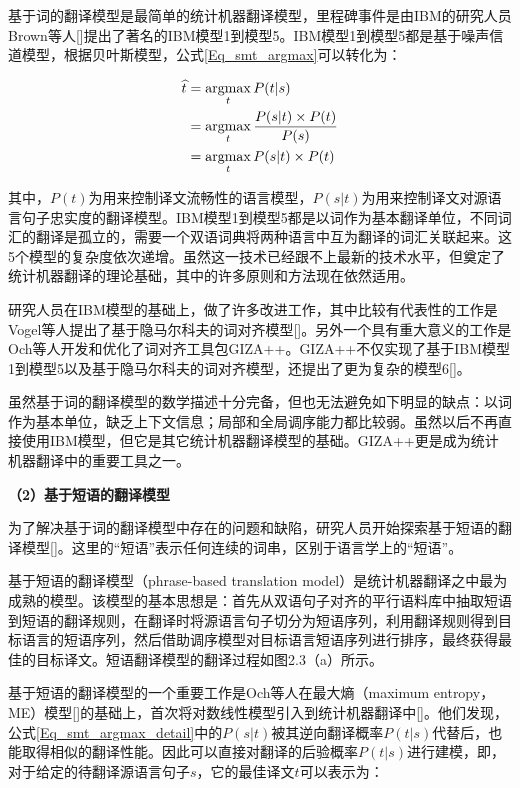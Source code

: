 基于词的翻译模型是最简单的统计机器翻译模型，里程碑事件是由IBM的研究人员Brown等人[\cite{Brown:1990,Brown:1993}]提出了著名的IBM模型1到模型5。IBM模型1到模型5都是基于噪声信道模型，根据贝叶斯模型，公式\ref{Eq_smt_argmax}可以转化为：

\begin{equation}
\label{Eq_smt_argmax_detail}
\begin{split}
\widehat{t} & = \mathop{\argmax}_{t}{P(t|s)} \\
& = \mathop{\argmax}_{t}{\frac{P(s|t) \times P(t)}{P(s)}} \\
& = \mathop{\argmax}_{t}{P(s|t) \times P(t)} 
\end{split}
\end{equation}

其中，$P(t)$为用来控制译文流畅性的语言模型，$P(s|t)$为用来控制译文对源语言句子忠实度的翻译模型。IBM模型1到模型5都是以词作为基本翻译单位，不同词汇的翻译是孤立的，需要一个双语词典将两种语言中互为翻译的词汇关联起来。这5个模型的复杂度依次递增。虽然这一技术已经跟不上最新的技术水平，但奠定了统计机器翻译的理论基础，其中的许多原则和方法现在依然适用。

研究人员在IBM模型的基础上，做了许多改进工作，其中比较有代表性的工作是Vogel等人提出了基于隐马尔科夫的词对齐模型[\cite{Vogel:1996}]。另外一个具有重大意义的工作是Och等人开发和优化了词对齐工具包GIZA++。GIZA++不仅实现了基于IBM模型1到模型5以及基于隐马尔科夫的词对齐模型，还提出了更为复杂的模型6[\cite{Och:2003b}]。

虽然基于词的翻译模型的数学描述十分完备，但也无法避免如下明显的缺点：以词作为基本单位，缺乏上下文信息；局部和全局调序能力都比较弱。虽然以后不再直接使用IBM模型，但它是其它统计机器翻译模型的基础。GIZA++更是成为统计机器翻译中的重要工具之一。

\textbf{（2）基于短语的翻译模型}

为了解决基于词的翻译模型中存在的问题和缺陷，研究人员开始探索基于短语的翻译模型[\cite{Wang:1998,Och:1999,Och:2002,Koehn:2003,Koehn:2004a,Koehn:2007}]。这里的“短语”表示任何连续的词串，区别于语言学上的“短语”。

基于短语的翻译模型（phrase-based translation model）是统计机器翻译之中最为成熟的模型。该模型的基本思想是：首先从双语句子对齐的平行语料库中抽取短语到短语的翻译规则，在翻译时将源语言句子切分为短语序列，利用翻译规则得到目标语言的短语序列，然后借助调序模型对目标语言短语序列进行排序，最终获得最佳的目标译文。短语翻译模型的翻译过程如图2.3（a）所示。

基于短语的翻译模型的一个重要工作是Och等人在最大熵（maximum entropy，ME）模型[\cite{Berger:1996}]的基础上，首次将对数线性模型引入到统计机器翻译中[\cite{Och:2002}]。他们发现，公式\ref{Eq_smt_argmax_detail}中的$P(s|t)$被其逆向翻译概率$P(t|s)$代替后，也能取得相似的翻译性能。因此可以直接对翻译的后验概率$P(t|s)$进行建模，即，对于给定的待翻译源语言句子$s$，它的最佳译文$t$可以表示为：


